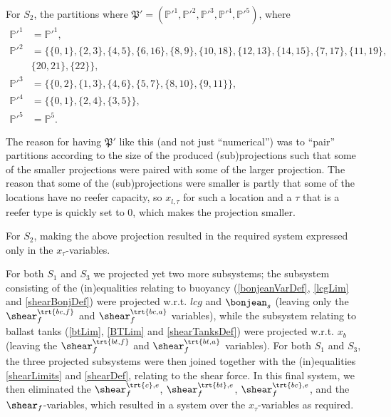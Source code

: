 %
For $S_2$, the partitions where $\mathfrak{P}' = (\mathbb{P}'^1, \mathbb{P}'^2, \mathbb{P}'^3, \mathbb{P}'^4, \mathbb{P}'^5)$, where 
\begin{align*}
\mathbb{P}'^1 &= \mathbb{P}'^1,\\  
\mathbb{P}'^2 &= \big\{ \{0,1\}, \{2,3\}, \{4,5\}, \{6,16\}, \{8,9\}, \{10,18\}, \{12,13\}, \{14,15\}, \{7,17\},
						   \{11,19\},\\& \{20,21\}, \{22\} \big\},\\
\mathbb{P}'^3 &= \big\{ \{0,2\}, \{1,3\}, \{4,6\}, \{5,7\}, \{8,10\}, \{9,11\} \big\},\\
\mathbb{P}'^4 &= \big\{ \{0,1\}, \{2,4\}, \{3,5\} \big\},\\
\mathbb{P}'^5 & = \mathbb{P}^5.
\end{align*}

The reason for having $\mathfrak{P}'$ like this (and not just ``numerical'') was to ``pair'' partitions according to the size of the produced (sub)projections such that some of the smaller projections were paired with some of the larger projection. The reason that some of the (sub)projections were smaller is partly that some of the locations have no reefer capacity, so $x_{l,\tau}$ for such a location and a $\tau$ that is a reefer type is quickly set to $0$, which makes the projection smaller.

For $S_2$, making the above projection resulted in the required system expressed only in the $x_\tau$-variables.

For both $S_1$ and $S_3$ we projected yet two more subsystems; the subsystem consisting of the (in)equalities relating to buoyancy (\eqref{bonjeanVarDef}, \eqref{lcgLim}  and \eqref{shearBonjDef}) were projected w.r.t. $lcg$ and $\bonjean_s$ (leaving only the $\shear^{\trt{bc,f}}_f$ and $\shear^{\trt{bc,a}}_f$ variables), while the subsystem relating to ballast tanks (\eqref{btLim}, \eqref{BTLim} and \eqref{shearTanksDef}) were projected w.r.t. $x_b$ (leaving the $\shear^\trt{bt,f}_f$ and $\shear^\trt{bt,a}_f$ variables). 
For both $S_1$ and $S_3$, the three projected subsystems were then joined together with the (in)equalities \eqref{shearLimits} and \eqref{shearDef}, relating to the shear force. In this final system, we then eliminated the $\shear^{\trt{c},e}_f$, $\shear^{\trt{bt},e}_f$, $\shear^{\trt{bc},e}_f$, and the $\shear_f$-variables, which resulted in a system over the $x_\tau$-variables as required. %


